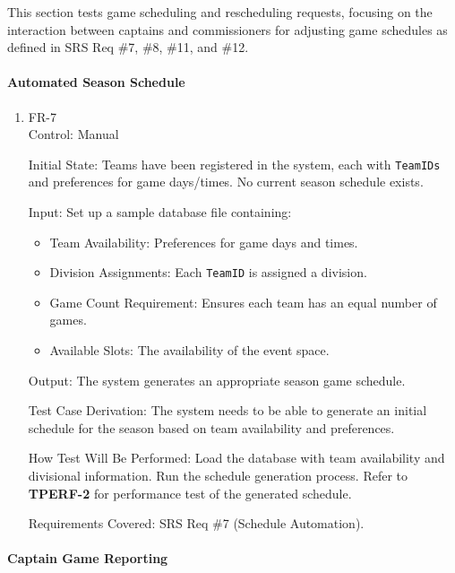 \documentclass[12pt, titlepage]{article}
\begin{document}
This section tests game scheduling and rescheduling requests, focusing on the interaction between captains and commissioners for adjusting game schedules as defined in SRS Req \#7, \#8, \#11, and \#12.

\paragraph{Automated Season Schedule}

\begin{enumerate}

    \item{FR-7\\}
          Control: Manual

          Initial State: Teams have been registered in the system, each with \texttt{TeamIDs} and preferences for game days/times. No current season schedule exists.

          Input:
          Set up a sample database file containing:
          \begin{itemize}
              \item Team Availability: Preferences for game days and times.
              \item Division Assignments: Each \texttt{TeamID} is assigned a division.
              \item Game Count Requirement: Ensures each team has an equal number of games.
              \item Available Slots: The availability of the event space.
          \end{itemize}

          Output: The system generates an appropriate season game schedule.

          Test Case Derivation: The system needs to be able to generate an initial schedule for the season based on team availability and preferences.

          How Test Will Be Performed: Load the database with team availability and divisional information. Run the schedule generation process. Refer to \textbf{TPERF-2} for performance test of the generated schedule.

          Requirements Covered: SRS Req \#7 (Schedule Automation).

\end{enumerate}

\paragraph{Captain Game Reporting}
\end{document}
